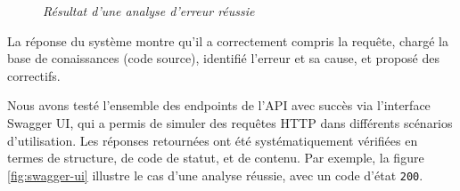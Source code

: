 \documentclass[12pt,a4paper]{report}
\begin{document}
	\begin{figure}[H]
		\centering
		\caption{\textit{Résultat d'une analyse d'erreur réussie}}
		\label{fig:premier-test}
	\end{figure}
	
	La réponse du système montre qu'il a correctement compris la requête, chargé la base de conaissances (code source), identifié l'erreur et sa cause, et proposé des correctifs. 
	
	Nous avons testé l'ensemble des endpoints de l'API avec succès via l'interface Swagger UI, qui a permis de simuler des requêtes HTTP dans différents scénarios d'utilisation. Les réponses retournées ont été systématiquement vérifiées en termes de structure, de code de statut, et de contenu. Par exemple, la figure \ref{fig:swagger-ui} illustre le cas d'une analyse réussie, avec un code d'état \verb|200|.
	
\end{document}
